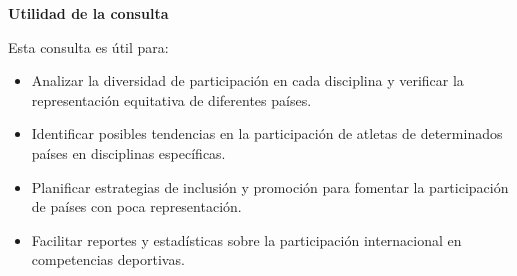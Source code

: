 \textbf{Utilidad de la consulta}

Esta consulta es útil para:
\begin{itemize}
    \item Analizar la diversidad de participación en cada disciplina y verificar la representación equitativa de diferentes países.
    \item Identificar posibles tendencias en la participación de atletas de determinados países en disciplinas específicas.
    \item Planificar estrategias de inclusión y promoción para fomentar la participación de países con poca representación.
    \item Facilitar reportes y estadísticas sobre la participación internacional en competencias deportivas.
\end{itemize}
